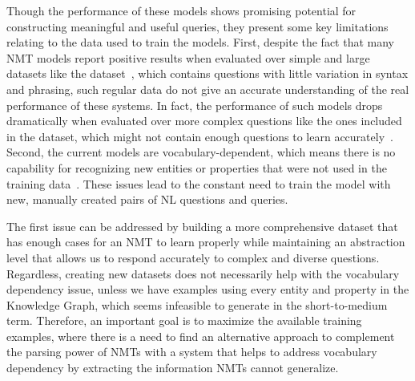 Though the performance of these models shows promising potential for constructing meaningful 
and useful \SPARQL{} queries, they present some key limitations relating to the data 
used to train the models. First, despite the fact that many NMT models report positive results 
when evaluated over simple and large datasets like the \DBNQA{} dataset~\cite{nmt:nl-to-sparql-Yin19}, 
which contains questions with little variation in syntax and phrasing, such regular data do not give 
an accurate understanding of the real performance of these systems. In fact, the performance of such 
models drops dramatically when evaluated over more complex questions like the ones included in the 
\LCQuADone dataset, which might not contain enough questions to learn 
accurately~\cite{nmt:nl-to-sparql-Yin19}. Second, the current models are vocabulary-dependent, which 
means there is no capability for recognizing new entities or properties that were not used in the 
training data~\cite{nmt:nl-to-sparql-Yin19}. These issues lead to the constant need to train the model 
with new, manually created pairs of NL questions and \SPARQL{} queries.

The first issue can be addressed by building a more comprehensive dataset that has enough 
cases for an NMT to learn properly while maintaining an abstraction level that allows us to 
respond accurately to complex and diverse questions. Regardless, creating new datasets does 
not necessarily help with the vocabulary dependency issue, unless we have examples using 
every entity and property in the Knowledge Graph, which seems infeasible to generate in the 
short-to-medium term. Therefore, an important goal is to maximize the available training examples, 
where there is a need to find an alternative approach to complement the parsing power 
of NMTs with a system that helps to address vocabulary dependency by extracting the 
information NMTs cannot generalize.

